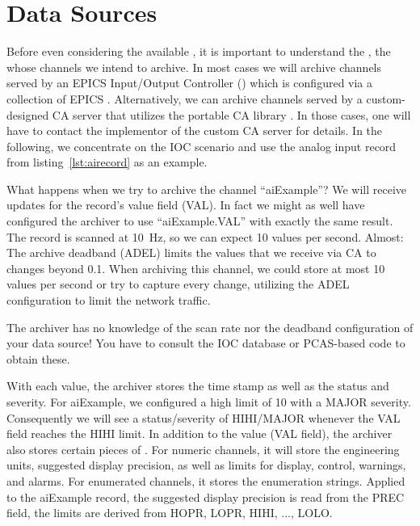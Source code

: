 \section{Data Sources} \label{sec:datasource} %
Before even considering the available , it is
important to understand the , the  whose channels we intend to archive.
In most cases we will archive channels served by an EPICS Input/Output
Controller () which is configured via a collection of EPICS
.
Alternatively, we can archive channels served by a custom-designed CA
server that utilizes the portable CA library .
In those cases, one will have to contact the implementor of the custom
CA server for details.
In the following, we concentrate on the IOC scenario and use the
analog input record from listing~\ref{lst:airecord} as an example.

 

\noindent What happens when we try to archive the channel ``aiExample''?
We will receive updates for the record's value field (VAL). In fact we
might as well have configured the archiver to use ``aiExample.VAL''
with exactly the same result.
The record is scanned at 10~Hz, so we can expect 10 values per second.
Almost: The archive deadband (ADEL) limits the values that we receive
via CA to changes beyond 0.1. When archiving this channel, we could
store at most 10 values per second or try to capture every change,
utilizing the ADEL configuration to limit the network traffic.

\NOTE The archiver has no knowledge of the scan rate nor the deadband
configuration of your data source! You have to consult the IOC
database or PCAS-based code to obtain these.

With each value, the archiver stores the time stamp as well as the
status and severity. For aiExample, we configured a high limit of 10
with a MAJOR severity. Consequently we will see a status/severity of
HIHI/MAJOR whenever the VAL field reaches the HIHI limit.
In addition to the value (VAL field), the archiver also stores certain
pieces of . For numeric channels, it will store the
engineering units, suggested display precision, as well as limits for
display, control, warnings, and alarms. For enumerated channels, it
stores the enumeration strings.
Applied to the aiExample record, the suggested display precision is
read from the PREC field, the limits are derived from HOPR, LOPR,
HIHI, ..., LOLO.

